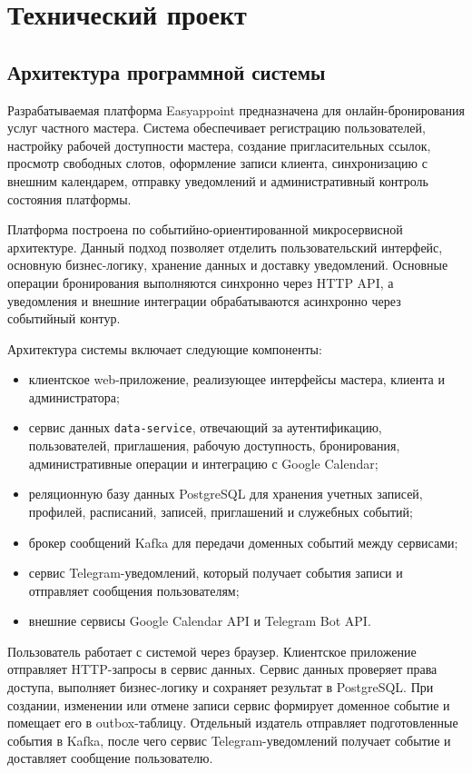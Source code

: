 \section{Технический проект}
\subsection{Архитектура программной системы}

Разрабатываемая платформа Easyappoint предназначена для онлайн-бронирования услуг частного мастера. Система обеспечивает регистрацию пользователей, настройку рабочей доступности мастера, создание пригласительных ссылок, просмотр свободных слотов, оформление записи клиента, синхронизацию с внешним календарем, отправку уведомлений и административный контроль состояния платформы.

Платформа построена по событийно-ориентированной микросервисной архитектуре. Данный подход позволяет отделить пользовательский интерфейс, основную бизнес-логику, хранение данных и доставку уведомлений. Основные операции бронирования выполняются синхронно через HTTP API, а уведомления и внешние интеграции обрабатываются асинхронно через событийный контур.

Архитектура системы включает следующие компоненты:
\begin{itemize}
\item клиентское web-приложение, реализующее интерфейсы мастера, клиента и администратора;
\item сервис данных \texttt{data-service}, отвечающий за аутентификацию, пользователей, приглашения, рабочую доступность, бронирования, административные операции и интеграцию с Google Calendar;
\item реляционную базу данных PostgreSQL для хранения учетных записей, профилей, расписаний, записей, приглашений и служебных событий;
\item брокер сообщений Kafka для передачи доменных событий между сервисами;
\item сервис Telegram-уведомлений, который получает события записи и отправляет сообщения пользователям;
\item внешние сервисы Google Calendar API и Telegram Bot API.
\end{itemize}

Пользователь работает с системой через браузер. Клиентское приложение отправляет HTTP-запросы в сервис данных. Сервис данных проверяет права доступа, выполняет бизнес-логику и сохраняет результат в PostgreSQL. При создании, изменении или отмене записи сервис формирует доменное событие и помещает его в outbox-таблицу. Отдельный издатель отправляет подготовленные события в Kafka, после чего сервис Telegram-уведомлений получает событие и доставляет сообщение пользователю.

